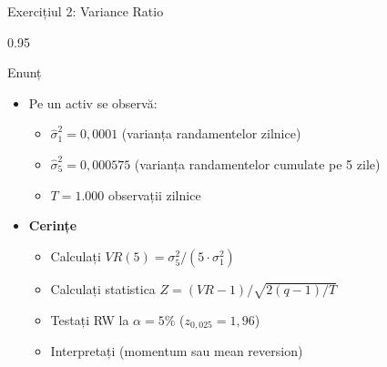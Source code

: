 \documentclass[9pt, aspectratio=169, t]{beamer}
\begin{document}
\begin{frame}[shrink=15]{Exercițiul 2: Variance Ratio}
\begin{cminipage}{0.95\textwidth}
\begin{block}{Enunț}
\begin{itemize}\setlength{\itemsep}{0pt}
    \item Pe un activ se observă:
    \begin{itemize}\setlength{\itemsep}{0pt}
        \item $\hat\sigma^2_1 = 0{,}0001$ (varianța randamentelor zilnice)
        \item $\hat\sigma^2_5 = 0{,}000575$ (varianța randamentelor cumulate pe 5 zile)
        \item $T = 1.000$ observații zilnice
    \end{itemize}
\end{itemize}
\end{block}

\begin{itemize}\setlength{\itemsep}{0pt}
    \item \textbf{Cerințe}
    \begin{itemize}\setlength{\itemsep}{0pt}
        \item Calculați $VR(5) = \sigma^2_5 / (5 \cdot \sigma^2_1)$
        \item Calculați statistica $Z = (VR - 1)/\sqrt{2(q-1)/T}$
        \item Testați RW la $\alpha = 5\%$ ($z_{0{,}025} = 1{,}96$)
        \item Interpretați (momentum sau mean reversion)
    \end{itemize}
\end{itemize}
\end{cminipage}
\end{frame}
\end{document}
